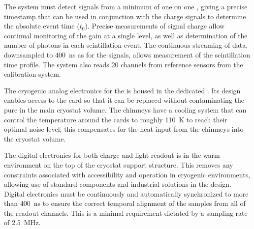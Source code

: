 The   system must detect signals from a minimum of one \phel on one , giving a precise timestamp that can be used in conjunction with the charge signals to determine the absolute event time ($t_0$). Precise measurements of  signal charge allow  continual monitoring of the  gain at a single \phel level, as well as determination of the number of photons in each scintillation event. 
The continuous  streaming of data, downsampled to \SI{400}{ns} as for the  signals, allows measurement of the scintillation time profile. The  system also reads \num{20} channels from reference   sensors from the  calibration system.


The cryogenic analog electronics for the  is housed in the dedicated . Its design enables access to the  card so that it can be replaced without contaminating the pure \lar in the main cryostat volume. The chimneys have a cooling system that can control the temperature around the  cards to roughly \SI{110}{\kelvin} to reach their optimal noise level; this compensates for the heat input from the chimneys into the cryostat volume. 

The digital electronics for both charge and light readout is in the warm environment on the top of the cryostat support structure. %
This removes any constraints associated with  accessibility and operation in cryogenic environments, allowing use of standard components and industrial solutions in the design. Digital electronics must be continuously and automatically synchronized to more than \SI{400}{\nano\s} to ensure the correct temporal alignment of the  samples from all of the readout channels. This is a minimal requirement dictated by a sampling rate of \SI{2.5}{\MHz}.  

